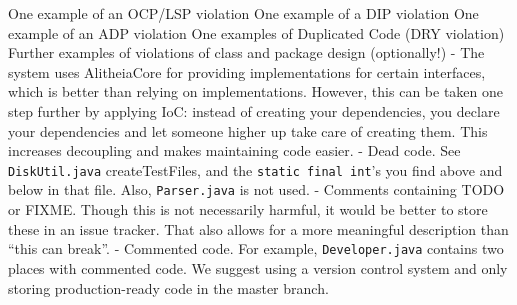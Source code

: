 \documentclass{article}
\begin{document}
One example of an OCP/LSP violation
One example of a DIP violation
One example of an ADP violation
One examples of Duplicated Code (DRY violation)
Further examples of violations of class and package design (optionally!)
 - The system uses AlitheiaCore for providing implementations for certain interfaces, which is better than relying on implementations. However, this can be taken one step further by applying IoC: instead of creating your dependencies, you declare your dependencies and let someone higher up take care of creating them. This increases decoupling and makes maintaining code easier.
 - Dead code. See \verb|DiskUtil.java| createTestFiles, and the \verb|static final int|'s you find above and below in that file. Also, \verb|Parser.java| is not used.
 - Comments containing TODO or FIXME. Though this is not necessarily harmful, it would be better to store these in an issue tracker. That also allows for a more meaningful description than ``this can break''.
 - Commented code. For example, \verb|Developer.java| contains two places with commented code. We suggest using a version control system and only storing production-ready code in the master branch.
{}

\end{document}
